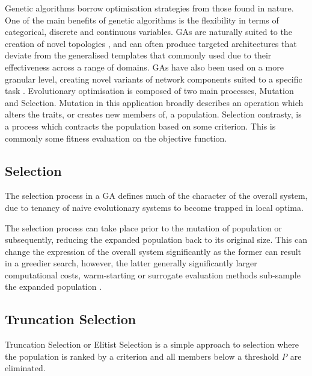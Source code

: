 \documentclass{article}
\begin{document}
	Genetic algorithms borrow optimisation strategies from those found in nature. One of the main benefits of genetic algorithms is the flexibility in terms of categorical, discrete and continuous variables. GAs are naturally suited to the creation of novel topologies\cite{24} \cite{25}, and can often produce targeted architectures that deviate from the generalised templates that commonly used due to their effectiveness across a range of domains. GAs have also been used on a more granular level, creating novel variants of network components suited to a specific task \cite{25}. Evolutionary optimisation is composed of two main processes, Mutation and Selection. Mutation in this application broadly describes an operation which alters the traits, or creates new members of, a population. Selection contrasty, is a process which contracts the population based on some criterion. This is commonly some fitness evaluation on the objective function.


\subsection {Selection}
	The selection process in a GA defines much of the character of the overall system, due to tenancy of naive evolutionary systems to become trapped in local optima.

	The selection process can take place prior to the mutation of population or subsequently, reducing the expanded population back to its original size. This can change the expression of the overall system significantly as the former can result in a greedier search, however, the latter generally significantly larger computational costs, warm-starting or surrogate evaluation methods sub-sample the expanded population \cite{5,13,39}.


	\subsection{Truncation Selection}

		Truncation Selection or Elitist Selection is a simple approach to selection where the population is ranked by a criterion and all members below a threshold \textit{P} are eliminated. 
\end{document}
